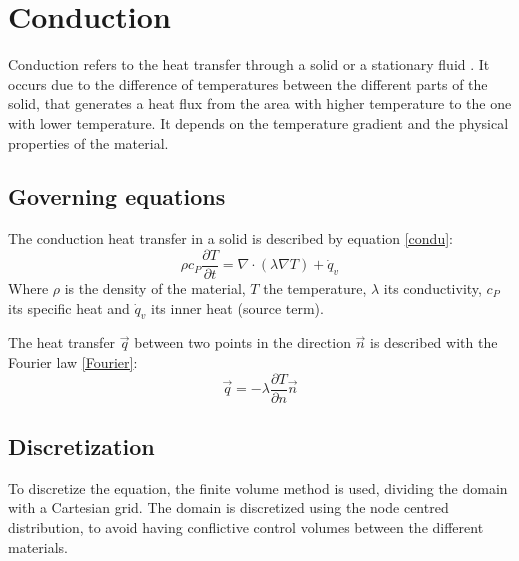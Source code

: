 \chapter{Conduction}
Conduction refers to the heat transfer through a solid or a stationary fluid \cite{Bergman2011}. It occurs due to the difference of temperatures between the different parts of the solid, that generates a heat flux from the area with higher temperature to the one with lower temperature. It depends on the temperature gradient and the physical properties of the material.

\section{Governing equations}
The conduction heat transfer in a solid is described by equation \ref{condu}:
\begin{equation}
\rho c_{P}\frac{\partial T}{\partial t}=\nabla\cdot\left(\lambda\nabla T\right)+\dot{q}_{v}
\label{condu}
\end{equation}
Where $\rho$ is the density of the material, $T$ the temperature, $\lambda$ its conductivity, $c_{P}$ its specific heat and $\dot{q}_{v}$ its inner heat (source term).

The heat transfer $\vec{q}$ between two points in the direction $\vec{n}$ is described with the Fourier law \ref{Fourier}:
\begin{equation}
\vec{q}=-\lambda\frac{\partial T}{\partial n}\vec{n}
\label{Fourier}
\end{equation}

\section{Discretization}
To discretize the equation, the finite volume method is used, dividing the domain with a Cartesian grid. The domain is discretized using the node centred distribution, to avoid having conflictive control volumes between the different materials.

